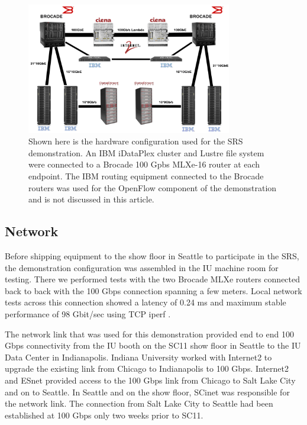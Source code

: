 \documentclass[]{sigplan-proc}
\begin{document}
\begin{figure}[t]
\begin{center}
\includegraphics[width=0.80\textwidth]{figures/hardware.png}
\caption{Shown here is the hardware configuration used for the SRS demonstration. An IBM iDataPlex cluster and
  Lustre file system were connected to a Brocade 100 Gpbs MLXe-16 router at each endpoint. The IBM routing
  equipment connected to the Brocade routers was used for the OpenFlow component of the demonstration and is
  not discussed in this article. }
\label{fig:hardwaresetup}
\end{center}
\end{figure}

\subsection{Network}

Before shipping equipment to the show floor in Seattle to participate in the SRS, the demonstration
configuration was assembled in the IU machine room for testing.  There we performed tests with the two Brocade
MLXe routers connected back to back with the 100 Gbps connection spanning a few meters.  Local network tests
across this connection showed a latency of 0.24 ms and maximum stable performance of 98 Gbit/sec using TCP
iperf \cite{iperf2012}.

The network link that was used for this demonstration provided end to end 100 Gbps connectivity from the IU
booth on the SC11 show floor in Seattle to the IU Data Center in Indianapolis. Indiana University worked with
Internet2 to upgrade the existing link from Chicago to Indianapolis to 100 Gbps. Internet2 and ESnet provided access to the 100 Gbps link from Chicago to Salt Lake City and on to
Seattle. In Seattle and on the show floor, SCinet was responsible for the network link. The connection from
Salt Lake City to Seattle had been established at 100 Gbps only two weeks prior to SC11.
\end{document}
